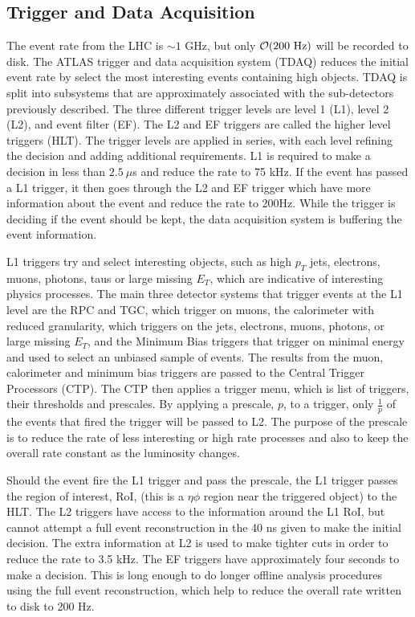 \subsection{Trigger and Data Acquisition}
\label{sec:Det:Trig}
The event rate from the LHC is $\sim1$ GHz, but only $\mathcal{O}(200~\rm Hz)$ will be recorded to disk. 
The ATLAS trigger and data acquisition system (TDAQ) reduces the initial event rate by select the most interesting events containing high \pt{} objects.
TDAQ is split into subsystems that are approximately associated with the sub-detectors previously described. 
The three different trigger levels are level 1 (L1), level 2 (L2), and event filter (EF). 
The L2 and EF triggers are called the higher level triggers (HLT). 
The trigger levels are applied in series, with each level refining the decision and adding additional requirements. 
L1 is required to make a decision in less than $2.5~\mu$s and reduce the rate to 75 kHz. 
If the event has passed a L1 trigger, it then goes through the L2 and EF trigger which have more information about the event and reduce the rate to 200Hz.
While the trigger is deciding if the event should be kept, the data acquisition system is buffering the event information.


L1 triggers try and select interesting objects, such as high $p_T$ jets, electrons, muons, photons, taus or large missing $E_T$, which are indicative of interesting physics processes. 
The main three detector systems that trigger events at the L1 level are the RPC and TGC, which trigger on muons, the calorimeter with reduced granularity, which triggers on the jets, electrons, muons, photons, or large missing $E_T$, and the Minimum Bias triggers that trigger on minimal energy and used to select an unbiased sample of events. 
The results from the muon, calorimeter and minimum bias triggers are passed to the Central Trigger Processors (CTP). 
The CTP then applies a trigger menu, which is list of triggers, their thresholds and prescales. 
By applying a prescale, $p$, to a trigger, only $\frac{1}{p}$ of the events that fired the trigger will be passed to L2. 
The purpose of the prescale is to reduce the rate of less interesting or high rate processes and also to keep the overall rate constant as the luminosity changes.

Should the event fire the L1 trigger and pass the prescale, the L1 trigger passes the region of interest, RoI, (this is a $\eta\phi$ region near the triggered object) to the HLT.
The L2 triggers have access to the information around the L1 RoI, but cannot attempt a  full event reconstruction in the 40 ns given to make the initial decision. 
The extra information at L2 is used to make tighter cuts in order to reduce the rate to 3.5 kHz.
The EF triggers have approximately four seconds to make a decision.
This is long enough to do longer offline analysis procedures using the full event reconstruction, which help to reduce the overall rate written to disk to 200 Hz.

